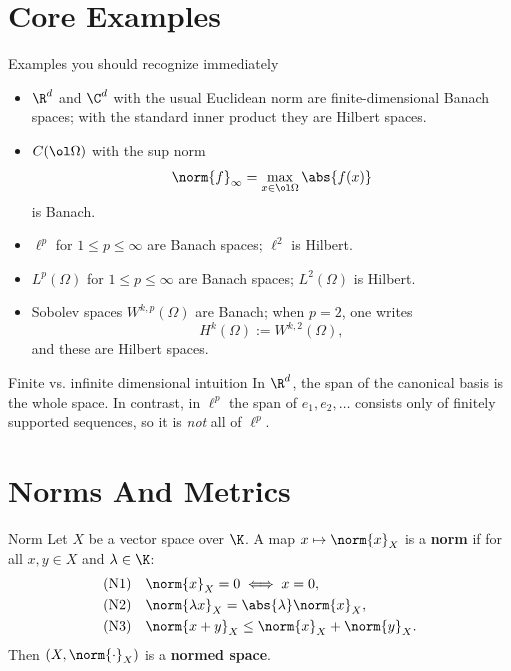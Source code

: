 \documentclass[11pt]{article}
\newcommand{\Lp}{L^p}
\begin{document}
\section{Core Examples}

\begin{exbox}{Examples you should recognize immediately}
\begin{itemize}
\item $\R^d$ and $\C^d$ with the usual Euclidean norm are finite-dimensional Banach spaces; with the standard inner product they are Hilbert spaces.
\item $C(\ol\Omega)$ with the sup norm
\[
\norm{f}_{\infty}=\max_{x\in\ol\Omega}\abs{f(x)}
\]
is Banach.
\item $\ell^p$ for $1\le p\le \infty$ are Banach spaces; $\ell^2$ is Hilbert.
\item $\Lp(\Omega)$ for $1\le p\le \infty$ are Banach spaces; $L^2(\Omega)$ is Hilbert.
\item Sobolev spaces $W^{k,p}(\Omega)$ are Banach; when $p=2$, one writes
\[
H^k(\Omega):=W^{k,2}(\Omega),
\]
and these are Hilbert spaces.
\end{itemize}
\end{exbox}

\begin{warningbox}{Finite vs. infinite dimensional intuition}
In $\R^d$, the span of the canonical basis is the whole space. In contrast, in $\ell^p$ the span of $e_1,e_2,\dots$ consists only of finitely supported sequences, so it is \emph{not} all of $\ell^p$.
\end{warningbox}

\section{Norms And Metrics}

\begin{defbox}{Norm}
Let $X$ be a vector space over $\K$. A map $x\mapsto \norm{x}_X$ is a \textbf{norm} if for all $x,y\in X$ and $\lambda\in\K$:
\begin{align*}
\text{(N1)}\quad & \norm{x}_X=0 \iff x=0,
\\
\text{(N2)}\quad & \norm{\lambda x}_X=\abs{\lambda}\norm{x}_X,
\\
\text{(N3)}\quad & \norm{x+y}_X\le \norm{x}_X+\norm{y}_X.
\end{align*}
Then $(X,\norm{\cdot}_X)$ is a \textbf{normed space}.
\end{defbox}
\end{document}
